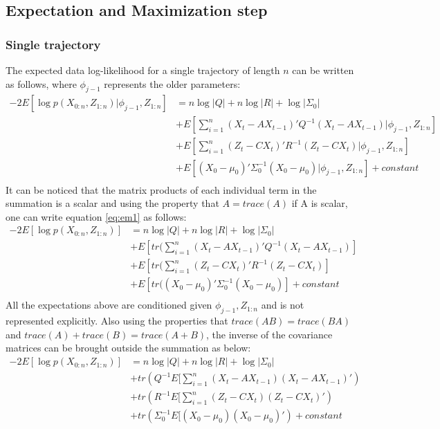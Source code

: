 \documentclass{article}
\begin{document}
\subsection{Expectation and Maximization step}\label{ssec:EM_Theory}
\subsubsection{Single trajectory}
 The expected data log-likelihood for a single trajectory of length $n$ can be written as follows, where $\phi_{j-1}$ represents the older parameters:
\begin{equation}\label{eq:em1}
\begin{split}
     -2E[\log p(X_{0:n},Z_{1:n})|\phi_{j-1},Z_{1:n}] &=n\log |Q|+n\log|R| + \log|\Sigma_0|\\
     &+ E[\sum_{i=1}^n(X_t-AX_{t-1})'Q^{-1}(X_t-AX_{t-1}) |\phi_{j-1},Z_{1:n}] \\ 
 &+ E[\sum_{i=1}^n(Z_t-CX_t)'R^{-1}(Z_t-CX_t)|\phi_{j-1},Z_{1:n}]\\
 &+ E[(X_0-\mu_0)'\Sigma_0^{-1}(X_0-\mu_0)|\phi_{j-1},Z_{1:n}] +constant\\
\end{split}
\end{equation}
It can be noticed that the matrix products of each individual term in the summation is a scalar and using the property that $A=trace(A)$ if A is scalar, one can write equation \ref{eq:em1} as follows:
\begin{equation}
\begin{split}
     -2E[\log p(X_{0:n},Z_{1:n})] &=n\log |Q|+n\log|R| + \log|\Sigma_0|\\
     &+ E[tr(\sum_{i=1}^n(X_t-AX_{t-1})'Q^{-1}(X_t-AX_{t-1})] \\ 
 &+ E[tr(\sum_{i=1}^n(Z_t-CX_t)'R^{-1}(Z_t-CX_t)]\\
 &+ E[tr((X_0-\mu_0)'\Sigma_0^{-1}(X_0-\mu_0)] +constant\\
\end{split}
\end{equation}
All the expectations above are conditioned given $\phi_{j-1},Z_{1:n}$ and is not represented explicitly. Also using the properties that $trace(AB)=trace(BA)$ and $trace(A)+trace(B)=trace(A+B)$, the inverse of the covariance matrices can be brought outside the summation as below:
\begin{equation}
\begin{split}
     -2E[\log p(X_{0:n},Z_{1:n})] &=n\log |Q|+n\log|R| + \log|\Sigma_0|\\
     &+ tr(Q^{-1}E[\sum_{i=1}^n(X_t-AX_{t-1})(X_t-AX_{t-1})') \\ 
 &+ tr(R^{-1}E[\sum_{i=1}^n(Z_t-CX_t)(Z_t-CX_t)')\\
 &+ tr(\Sigma_0^{-1}E[(X_0-\mu_0)(X_0-\mu_0)') +constant\\
\end{split}
\end{equation}
\end{document}
